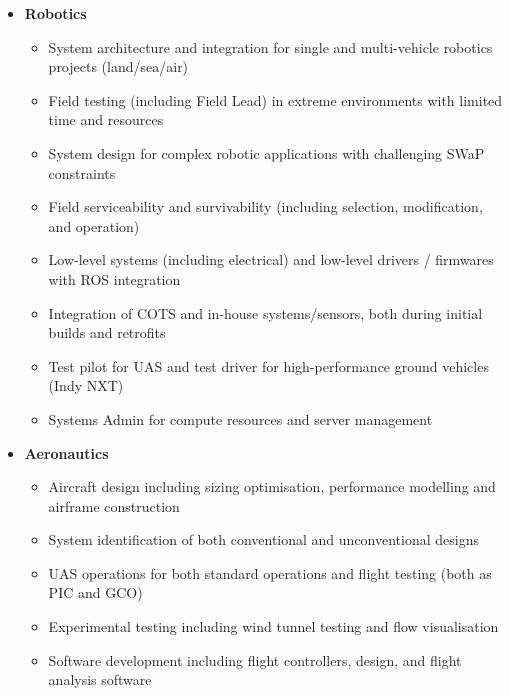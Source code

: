 \documentclass[12pt,letter,sans]{moderncv}        %
\begin{document}
\begin{itemize}
\item
{
    \textbf{Robotics}
        \vspace{3pt} 
        \begin{itemize}
			\item System architecture and integration for single and multi-vehicle robotics projects (land/sea/air)
            \item Field testing (including Field Lead) in extreme environments with limited time and resources
            \item System design for complex robotic applications with challenging SWaP constraints%
            \item Field serviceability and survivability (including selection, modification, and operation)
            \item Low-level systems (including electrical) and low-level drivers / firmwares with ROS integration
            \item Integration of COTS and in-house systems/sensors, both during initial builds and retrofits %
            \item Test pilot for UAS and test driver for high-performance ground vehicles (Indy NXT)
            \item Systems Admin for compute resources and server management
        \end{itemize}
}

\vspace{4pt}

\item
{
    \textbf{Aeronautics}
        \vspace{3pt} 
        \begin{itemize} 
            \item Aircraft design including sizing optimisation, performance modelling and airframe construction
            \item System identification of both conventional and unconventional designs
            \item UAS operations for both standard operations and flight testing (both as PIC and GCO)
            \item Experimental testing including wind tunnel testing and flow visualisation
            \item Software development including flight controllers, design, and flight analysis software
        \end{itemize}
}


\end{itemize}
\end{document}
